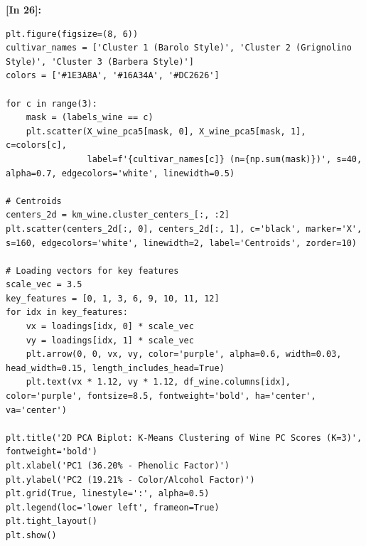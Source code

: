\vspace{0.4em}
\noindent\textbf{\small [In 26]:}
\begin{lstlisting}[style=pycode]
plt.figure(figsize=(8, 6))
cultivar_names = ['Cluster 1 (Barolo Style)', 'Cluster 2 (Grignolino Style)', 'Cluster 3 (Barbera Style)']
colors = ['#1E3A8A', '#16A34A', '#DC2626']

for c in range(3):
    mask = (labels_wine == c)
    plt.scatter(X_wine_pca5[mask, 0], X_wine_pca5[mask, 1], c=colors[c],
                label=f'{cultivar_names[c]} (n={np.sum(mask)})', s=40, alpha=0.7, edgecolors='white', linewidth=0.5)

# Centroids
centers_2d = km_wine.cluster_centers_[:, :2]
plt.scatter(centers_2d[:, 0], centers_2d[:, 1], c='black', marker='X', s=160, edgecolors='white', linewidth=2, label='Centroids', zorder=10)

# Loading vectors for key features
scale_vec = 3.5
key_features = [0, 1, 3, 6, 9, 10, 11, 12]
for idx in key_features:
    vx = loadings[idx, 0] * scale_vec
    vy = loadings[idx, 1] * scale_vec
    plt.arrow(0, 0, vx, vy, color='purple', alpha=0.6, width=0.03, head_width=0.15, length_includes_head=True)
    plt.text(vx * 1.12, vy * 1.12, df_wine.columns[idx], color='purple', fontsize=8.5, fontweight='bold', ha='center', va='center')

plt.title('2D PCA Biplot: K-Means Clustering of Wine PC Scores (K=3)', fontweight='bold')
plt.xlabel('PC1 (36.20% - Phenolic Factor)')
plt.ylabel('PC2 (19.21% - Color/Alcohol Factor)')
plt.grid(True, linestyle=':', alpha=0.5)
plt.legend(loc='lower left', frameon=True)
plt.tight_layout()
plt.show()
\end{lstlisting}

